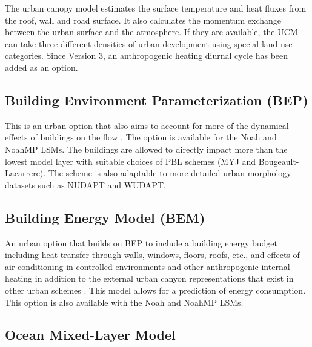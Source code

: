 The urban canopy model estimates the surface temperature and heat
fluxes from the roof, wall and road surface. It also calculates
the momentum exchange between the urban surface and the atmosphere.
If they are available, the UCM can take three different densities
of urban development using special land-use categories.
Since Version 3, an anthropogenic heating diurnal cycle has been added as
an option.

\subsection{Building Environment Parameterization (BEP)}

This is an urban option that also aims to account for more of the dynamical effects of buildings on the flow \citep{martilli02}.
The option is available for the Noah and NoahMP LSMs.
The buildings are allowed to directly impact more than the lowest model layer with suitable choices of PBL schemes (MYJ and Bougeault-Lacarrere).
The scheme is also adaptable to more detailed urban morphology datasets such as NUDAPT and WUDAPT.

\subsection{Building Energy Model (BEM)}

An urban option that builds on BEP to include a building energy budget including heat transfer through walls, windows, floors, roofs, etc., and effects of air conditioning
in controlled environments and other anthropogenic internal heating
in addition to the external urban canyon representations that exist in other urban schemes \citep{salamanca10}. This model allows for a prediction of energy consumption.
This option is also available with the Noah and NoahMP LSMs.

\subsection{Ocean Mixed-Layer Model}

